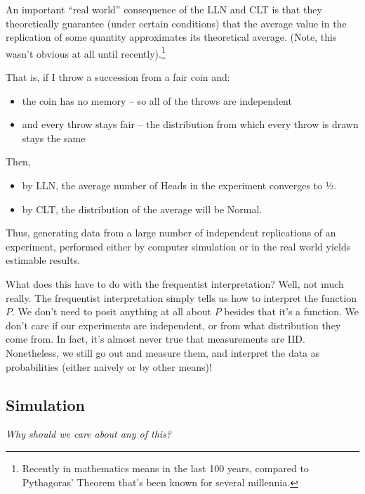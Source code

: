 %

An important ``real world'' consequence of the LLN and CLT is that they 
theoretically guarantee (under certain conditions) that the average value in the replication 
of some quantity approximates its theoretical average. 
(Note, this wasn't obvious at all until recently).\footnote{Recently in mathematics means in the last 100 years, 
compared to Pythagoras' Theorem that's been known for several millennia.}

That is, if I throw a succession from a fair coin and:
\begin{itemize}
\item the coin has no memory -- so all of the throws are independent
\item and every throw stays fair -- the distribution from which every throw is 
drawn stays the same
\end{itemize}

Then,
\begin{itemize}
\item by LLN, the average number of Heads in the experiment converges to ½. 
\item by CLT, the distribution of the average will be Normal.
\end{itemize}

Thus, generating data from a large number of independent replications of an experiment, 
performed either by computer simulation or in the real world yields estimable results.

What does this have to do with the frequentist interpretation? 
Well, not much really. 
The frequentist interpretation simply tells us how to interpret the function \(P\). 
We don't need to posit anything at all about \(P\) besides that it's a function. 
We don't care if our experiments are independent, 
or from what distribution they come from.
In fact, 
it's almost never true that measurements are IID. 
Nonetheless, we still go out and measure them, and interpret the data as probabilities (either naively or by other means)!

\subsection{Simulation}

\emph{Why should we care about any of this?}

